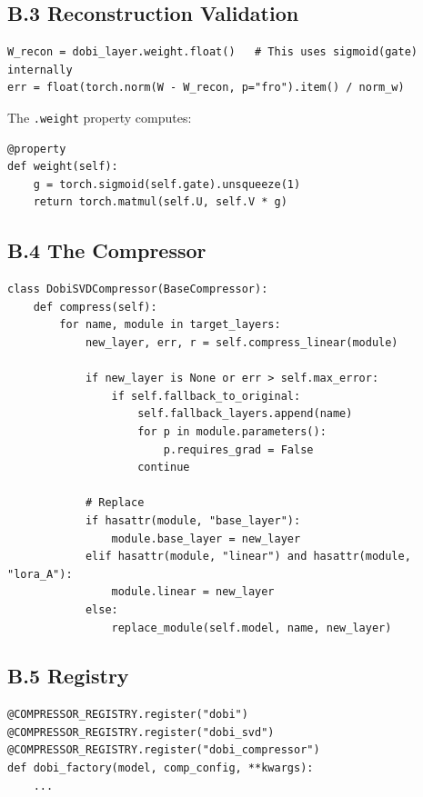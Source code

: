 \subsection{B.3 Reconstruction Validation}

\begin{lstlisting}
W_recon = dobi_layer.weight.float()   # This uses sigmoid(gate) internally
err = float(torch.norm(W - W_recon, p="fro").item() / norm_w)
\end{lstlisting}

The \texttt{.weight} property computes:

\begin{lstlisting}
@property
def weight(self):
    g = torch.sigmoid(self.gate).unsqueeze(1)
    return torch.matmul(self.U, self.V * g)
\end{lstlisting}

\subsection{B.4 The Compressor}

\begin{lstlisting}
class DobiSVDCompressor(BaseCompressor):
    def compress(self):
        for name, module in target_layers:
            new_layer, err, r = self.compress_linear(module)
            
            if new_layer is None or err > self.max_error:
                if self.fallback_to_original:
                    self.fallback_layers.append(name)
                    for p in module.parameters():
                        p.requires_grad = False
                    continue
            
            # Replace
            if hasattr(module, "base_layer"):
                module.base_layer = new_layer
            elif hasattr(module, "linear") and hasattr(module, "lora_A"):
                module.linear = new_layer
            else:
                replace_module(self.model, name, new_layer)
\end{lstlisting}

\subsection{B.5 Registry}

\begin{lstlisting}
@COMPRESSOR_REGISTRY.register("dobi")
@COMPRESSOR_REGISTRY.register("dobi_svd")
@COMPRESSOR_REGISTRY.register("dobi_compressor")
def dobi_factory(model, comp_config, **kwargs):
    ...
\end{lstlisting}

